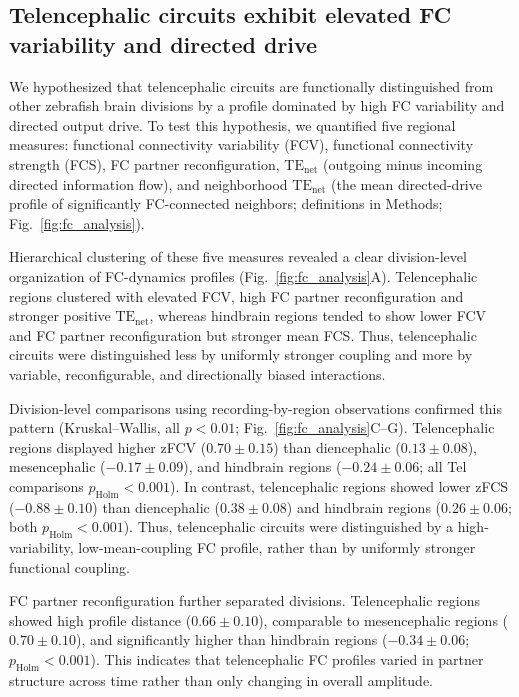 \documentclass[9pt,twocolumn,twoside]{pnas-new}
\begin{document}
\subsection*{Telencephalic circuits exhibit elevated FC variability and directed drive}

We hypothesized that telencephalic circuits are functionally distinguished from other zebrafish brain divisions by a profile dominated by high FC variability and directed output drive. To test this hypothesis, we quantified five regional measures: functional connectivity variability (FCV), functional connectivity strength (FCS), FC partner reconfiguration, $\mathrm{TE}_{\mathrm{net}}$ (outgoing minus incoming directed information flow), and neighborhood $\mathrm{TE}_{\mathrm{net}}$ (the mean directed-drive profile of significantly FC-connected neighbors; definitions in Methods; Fig.~\ref{fig:fc_analysis}).

Hierarchical clustering of these five measures revealed a clear division-level organization of FC-dynamics profiles (Fig.~\ref{fig:fc_analysis}A). Telencephalic regions clustered with elevated FCV, high FC partner reconfiguration and stronger positive $\mathrm{TE}_{\mathrm{net}}$, whereas hindbrain regions tended to show lower FCV and FC partner reconfiguration but stronger mean FCS. Thus, telencephalic circuits were distinguished less by uniformly stronger coupling and more by variable, reconfigurable, and directionally biased interactions.

Division-level comparisons using recording-by-region observations confirmed this pattern (Kruskal--Wallis, all $p < 0.01$; Fig.~\ref{fig:fc_analysis}C--G). Telencephalic regions displayed higher zFCV ($0.70 \pm 0.15$) than diencephalic ($0.13 \pm 0.08$), mesencephalic ($-0.17 \pm 0.09$), and hindbrain regions ($-0.24 \pm 0.06$; all Tel comparisons $p_{\mathrm{Holm}} < 0.001$). In contrast, telencephalic regions showed lower zFCS ($-0.88 \pm 0.10$) than diencephalic ($0.38 \pm 0.08$) and hindbrain regions ($0.26 \pm 0.06$; both $p_{\mathrm{Holm}} < 0.001$). Thus, telencephalic circuits were distinguished by a high-variability, low-mean-coupling FC profile, rather than by uniformly stronger functional coupling.

FC partner reconfiguration further separated divisions. Telencephalic regions showed high profile distance ($0.66 \pm 0.10$), comparable to mesencephalic regions ($0.70 \pm 0.10$), and significantly higher than hindbrain regions ($-0.34 \pm 0.06$; $p_{\mathrm{Holm}} < 0.001$). This indicates that telencephalic FC profiles varied in partner structure across time rather than only changing in overall amplitude.
\end{document}
